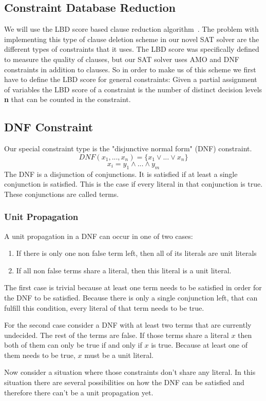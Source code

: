 \documentclass{easychair}
\begin{document}
\subsection{Constraint Database Reduction}

We will use the LBD score based clause reduction algorithm~\cite{audemard2009predicting}.
The problem with implementing this type of clause deletion scheme in our novel SAT solver are the different types of constraints that it uses. The LBD score was specifically defined to measure the quality of clauses, but our SAT solver uses AMO and DNF constraints in addition to clauses. So in order to make us of this scheme we first have to define the LBD score for general constraints:
Given a partial assignment of variables the LBD score of a constraint is the number of distinct decision levels \textbf{n} that can be counted in the constraint.



\subsection{DNF Constraint}
Our special constraint type is the "disjunctive normal form" (DNF) constraint.
\begin{displaymath}
DNF(x_1,...,x_n) = \{x_1 \vee ... \vee x_n \}
\end{displaymath}
\begin{displaymath}
x_i = y_1 \wedge ... \wedge y_m
\end{displaymath}
The DNF is a disjunction of conjunctions. It is satisfied if at least a single conjunction is satisfied. This is the case if every literal in that conjunction is true. These conjunctions are called terms.

\subsubsection{Unit Propagation}
A unit propagation in a DNF can occur in one of two cases:
\begin{enumerate}
\item If there is only one non false term left, then all of its literals are unit literals
\item If all non false terms share a literal, then this literal is a unit literal.
\end{enumerate}
The first case is trivial because at least one term needs to be satisfied in order for the DNF to be satisfied. Because there is only a single conjunction left, that can fulfill this condition, every literal of that term needs to be true.
\par
For the second case consider a DNF with at least two terms that are currently undecided. The rest of the terms are false. If those terms share a literal $x$ then both of them can only be true if and only if $x$ is true. Because at least one of them needs to be true, $x$ must be a unit literal.
\par
Now consider a situation where those constraints don't share any literal. In this situation there are several possibilities on how the DNF can be satisfied and therefore there can't  be a unit propagation yet.
\end{document}
